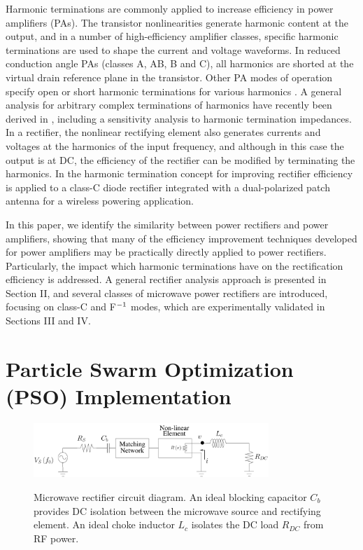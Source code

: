 Harmonic terminations are commonly applied to increase efficiency in power amplifiers (PAs). The transistor nonlinearities generate harmonic content at the output, and in a number of high-efficiency amplifier classes, specific harmonic terminations are used to shape the current and voltage waveforms. In reduced conduction angle PAs (classes A, AB, B and C), all harmonics are shorted at the virtual drain reference plane in the transistor. Other PA modes of operation specify open or short harmonic terminations for various harmonics \cite{raab01_finiteharmonics, raab02_PAoverview, kee_rutledge}. A general analysis for arbitrary complex terminations of harmonics have recently been derived in \cite{roberg2011}, including a sensitivity analysis to harmonic termination impedances. In a rectifier, the nonlinear rectifying element also generates currents and voltages at the harmonics of the input frequency, and although in this case the output is at DC, the efficiency of the rectifier can be modified by terminating the harmonics. In \cite{robergIMS2012} the harmonic termination concept for improving rectifier efficiency is applied to a class-C diode rectifier integrated with a dual-polarized patch antenna for a wireless powering application.

In this paper, we identify the similarity between power rectifiers and power amplifiers, showing that many of the efficiency improvement techniques developed for power amplifiers may be practically directly applied to power rectifiers. Particularly, the impact which harmonic terminations have on the rectification efficiency is addressed. A general rectifier analysis approach is presented in Section II, and several classes of microwave power rectifiers are introduced, focusing on class-C and F$^{\rm -1}$ modes, which are experimentally validated in Sections III and IV.


\section{Particle Swarm Optimization (PSO) Implementation}


\begin{figure}
  \begin{center}
  \includegraphics[width=3.5in]{pdf/01.pdf}\\
  \caption{Microwave rectifier circuit diagram. An ideal blocking capacitor $C_b$ provides DC isolation between the microwave source and rectifying element.  An ideal choke inductor $L_c$ isolates the DC load $R_{DC}$ from RF power.}\label{circuit_diagram}
  \end{center}
\end{figure}

